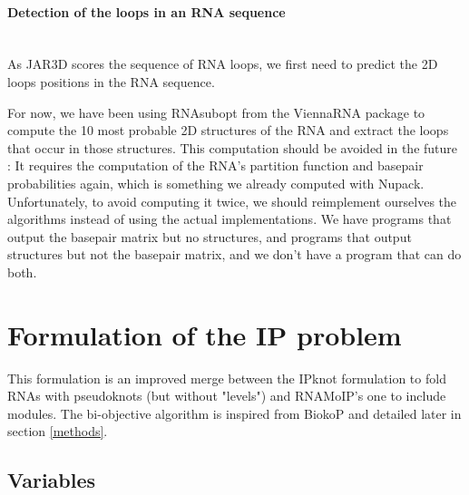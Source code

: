 \documentclass{article}
\begin{document}
\paragraph{\textbf{Detection of the loops in an RNA sequence}} ~ \\
As JAR3D scores the sequence of RNA loops, we first need to predict the 2D loops positions in the RNA sequence.

For now, we have been using RNAsubopt from the ViennaRNA package \cite{lorenz_viennarna_2011} to compute the 10 most probable 2D structures of the RNA and extract the loops that occur in those structures.
This computation should be avoided in the future : It requires the computation of the RNA's partition function and basepair probabilities again, which is something we already computed with Nupack.
Unfortunately, to avoid computing it twice, we should reimplement ourselves the algorithms instead of using the actual implementations. We have programs that output the basepair matrix but no structures, and programs that output structures but not the basepair matrix, and we don't have a program that can do both.

\section{Formulation of the IP problem}

This formulation is an improved merge between the IPknot \cite{sato_ipknot:_2011} formulation to fold RNAs with pseudoknots (but without "levels") and RNAMoIP's one \cite{reinharz_towards_2012} to include modules.
The bi-objective algorithm is inspired from BiokoP \cite{legendre_bi-objective_2018} and detailed later in section \ref{methods}.


\subsection{Variables}
\end{document}
